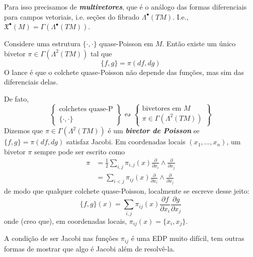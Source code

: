 Para isso precisamos de \textit{\textbf{multivetores}}, que é o análogo das formas diferenciais para campos vetoriais, i.e. seções do fibrado \(\Lambda^{\bullet}(TM)\). I.e., \(\mathfrak{X}^\bullet(M)=\Gamma(\Lambda^{\bullet}(TM))\).

Considere uma estrutura \(\{\cdot ,\cdot \}\) quase-Poisson em \(M\). Então existe um único bivetor \(\pi \in \Gamma(\Lambda^{2}(TM))\) tal que
\[\{f,g\}=\pi(df,dg)\]
O lance é que o colchete quase-Poisson não depende das funções, mas sim das diferenciais delas.

De fato,
\[\left\{ \substack{\text{colchetes quase-P}  \\ \{\cdot ,\cdot \}} \right\} \leftrightsquigarrow \left\{ \substack{\text{bivetores em \(M\)}  \\ \pi \in \Gamma(\Lambda^{2}(TM))} \right\} \]
Dizemos que \(\pi \in \Gamma(\Lambda^{2}(TM))\) é um \textit{\textbf{bivetor de Poisson}} se \(\{f,g\}=\pi(df,dg)\) satisfaz Jacobi. Em coordenadas locais \((x_1,\ldots,x_n)\), um bivetor \(\pi\) sempre pode ser escrito como
\begin{align*}
\pi&=\frac{1}{2}\sum_{i,j}\pi_{i,j}(x) \frac{\partial }{\partial x_i}\wedge \frac{\partial }{\partial x_j}\\
&=\sum_{i<j}\pi_{ij}(x)\frac{\partial }{\partial x_i}\wedge\frac{\partial }{\partial x_j}
\end{align*}
de modo que qualquer colchete quase-Poisson, localmente se escreve desse jeito:
\[\{f,g\}(x)=\sum_{i,j}\pi_{ij}(x)\frac{\partial f}{\partial x_i}\frac{\partial g}{\partial x_j}\]
onde (creo que), em coordenadas locais, \(\pi_{ij}(x)=\{x_i,x_j\}\).
\begin{remark}\leavevmode
	A condição de ser Jacobi nas funções \(\pi_{ij}\) é uma EDP muito difícil, tem outras formas de mostrar que algo é Jacobi além de resolvê-la.
\end{remark}

